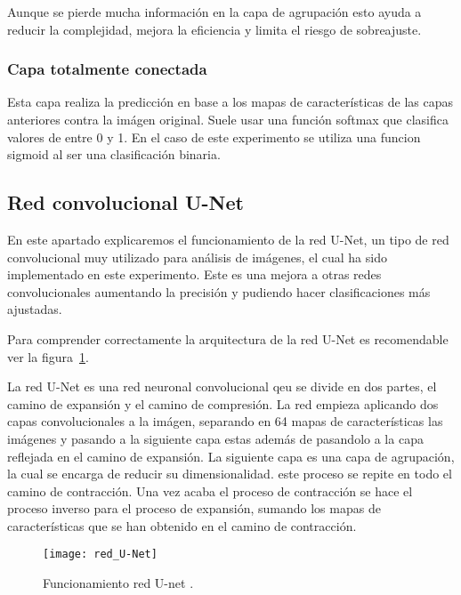 Aunque se pierde mucha información en la capa de agrupación esto ayuda a reducir la complejidad, mejora la eficiencia y limita el riesgo de sobreajuste. 

\subsubsection{Capa totalmente conectada}
Esta capa realiza la predicción en base a los mapas de características de las capas anteriores contra la imágen original. Suele usar una función softmax que clasifica valores de entre 0 y 1. En el caso de este experimento se utiliza una funcion sigmoid al ser una clasificación binaria.

\subsection{Red convolucional U-Net}
En este apartado explicaremos el funcionamiento de la red U-Net, un tipo de red convolucional muy utilizado para análisis de imágenes, el cual ha sido implementado en este experimento. Este es una mejora a otras redes convolucionales aumentando la precisión y pudiendo hacer clasificaciones más ajustadas.

Para comprender correctamente la arquitectura de la red U-Net \cite{Unet} es recomendable ver la figura~\ref{fig:red_U-Net}.

La red U-Net es una red neuronal convolucional qeu se divide en dos partes, el camino de expansión y el camino de compresión. La red empieza aplicando dos capas convolucionales a la imágen, separando en 64 mapas de características las imágenes y pasando a la siguiente capa estas además de pasandolo a la capa reflejada en el camino de expansión. La siguiente capa es una capa de agrupación, la cual se encarga de reducir su dimensionalidad. este proceso se repite en todo el camino de contracción. Una vez acaba el proceso de contracción se hace el proceso inverso para el proceso de expansión, sumando los mapas de características que se han obtenido en el camino de contracción.

\begin{figure}[H]
	\centering
	\texttt{[image: red\_U-Net]}
	\caption[Funcionamiento red U-net.]{Funcionamiento red U-net \cite{Unet}.}
	\label{fig:red_U-Net}
\end{figure}

